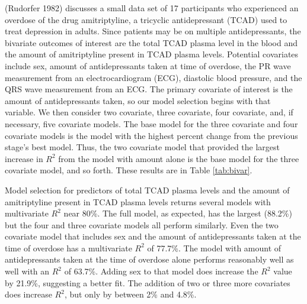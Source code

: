 (Rudorfer 1982) discusses a small data set of 17 participants who experienced an overdose of the drug amitriptyline, a tricyclic antidepressant (TCAD) used to treat depression in adults. Since patients may be on multiple antidepressants, the bivariate outcomes of interest are the total TCAD plasma level in the blood and the amount of amitriptyline present in TCAD plasma levels. Potential covariates include sex, amount of antidepressants taken at time of overdose, the PR wave measurement from an electrocardiogram (ECG), diastolic blood pressure, and the QRS wave measurement from an ECG. The primary covariate of interest is the amount of antidepressants taken, so our model selection begins with that variable. We then consider two covariate, three covariate, four covariate, and, if necessary, five covariate models. The base model for the three covariate and four covariate models is the model with the highest percent change from the previous stage's best model. Thus, the two covariate model that provided the largest increase in \(R^2\) from the model with amount alone is the base model for the three covariate model, and so forth. These results are in Table \ref{tab:bivar}.

Model selection for predictors of total TCAD plasma levels and the amount of amitriptyline present in TCAD plasma levels returns several models with multivariate \(R^2\) near 80\%. The full model, as expected, has the largest (88.2\%) but the four and three covariate models all perform similarly. Even the two covariate model that includes sex and the amount of antidepressants taken at the time of overdose has a multivariate \(R^2\) of 77.7\%. The model with amount of antidepressants taken at the time of overdose alone performs reasonably well as well with an \(R^2\) of 63.7\%. Adding sex to that model does increase the \(R^2\) value by 21.9\%, suggesting a better fit. The addition of two or three more covariates does increase \(R^2\), but only by between 2\% and 4.8\%.

